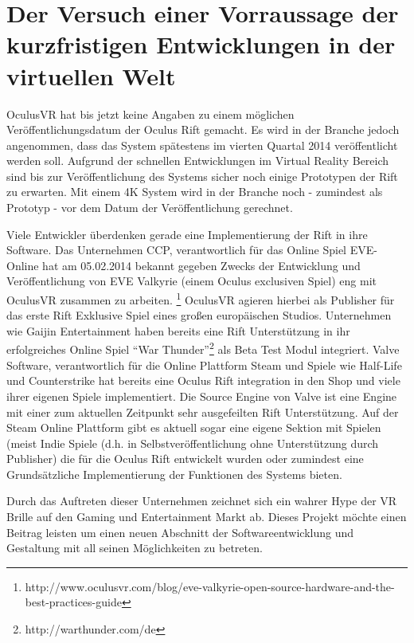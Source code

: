 \documentclass[pagesize, paper=a4, fontsize=12pt,titlepage=true, headings=small, headnosepline, abstractoff, liststotoc, nochapterprefix, plainheadsepline]{scrreprt}
\begin{document}
\chapter{Der Versuch einer Vorraussage der kurzfristigen Entwicklungen in der virtuellen Welt}
OculusVR hat bis jetzt keine Angaben zu einem möglichen Veröffentlichungsdatum der Oculus Rift gemacht. Es wird in der Branche jedoch angenommen, dass das System spätestens im vierten Quartal 2014 veröffentlicht werden soll. Aufgrund der schnellen Entwicklungen im Virtual Reality Bereich sind bis zur Veröffentlichung des Systems sicher noch einige Prototypen der Rift zu erwarten. Mit einem 4K System wird in der Branche noch - zumindest als Prototyp - vor dem Datum der Veröffentlichung gerechnet.

Viele Entwickler überdenken gerade eine Implementierung der Rift in ihre Software. Das Unternehmen CCP, verantwortlich für das Online Spiel EVE-Online hat am 05.02.2014 bekannt gegeben Zwecks der Entwicklung und Veröffentlichung von EVE Valkyrie (einem Oculus exclusiven Spiel) eng mit OculusVR zusammen zu arbeiten. \footnote{http://www.oculusvr.com/blog/eve-valkyrie-open-source-hardware-and-the-best-practices-guide} OculusVR agieren hierbei als Publisher für das erste Rift Exklusive Spiel eines großen europäischen Studios. Unternehmen wie Gaijin Entertainment haben bereits eine Rift Unterstützung in ihr erfolgreiches Online Spiel "`War Thunder"'\footnote{http://warthunder.com/de} als Beta Test Modul integriert. Valve Software, verantwortlich für die Online Plattform Steam und Spiele wie Half-Life und Counterstrike hat bereits eine Oculus Rift integration in den Shop und viele ihrer eigenen Spiele implementiert. Die Source Engine von Valve ist eine Engine mit einer zum aktuellen Zeitpunkt sehr ausgefeilten Rift Unterstützung. Auf der Steam Online Plattform gibt es aktuell sogar eine eigene Sektion mit Spielen (meist Indie Spiele (d.h. in Selbstveröffentlichung ohne Unterstützung durch Publisher) die für die Oculus Rift entwickelt wurden oder zumindest eine Grundsätzliche Implementierung der Funktionen des Systems bieten.

Durch das Auftreten dieser Unternehmen zeichnet sich ein wahrer Hype der VR Brille auf den Gaming und Entertainment Markt ab. Dieses Projekt möchte einen Beitrag leisten um einen neuen Abschnitt der Softwareentwicklung und Gestaltung mit all seinen Möglichkeiten zu betreten.


\end{document}
